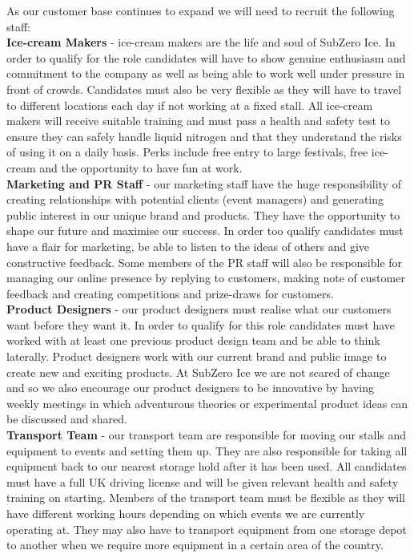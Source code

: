 \documentclass{article}
\begin{document}
  As our customer base continues to expand we will need to recruit the following staff: \\

  {\bf Ice-cream Makers} - ice-cream makers are the life and soul of SubZero Ice. In order to qualify for the role candidates will have to show genuine enthusiasm and commitment to the company as well as being able to work well under pressure in front of crowds. Candidates must also be very flexible as they will have to travel to different locations each day if not working at a fixed stall. All ice-cream makers will receive suitable training and must pass a health and safety test to ensure they can safely handle liquid nitrogen and that they understand the risks of using it on a daily basis. Perks include free entry to large festivals, free ice-cream and the opportunity to have fun at work. \\

  {\bf Marketing and PR Staff} - our marketing staff have the huge responsibility of creating relationships with potential clients (event managers) and generating public interest in our unique brand and products. They have the opportunity to shape our future and maximise our success. In order too qualify candidates must have a flair for marketing, be able to listen to the ideas of others and give constructive feedback. Some members of the PR staff will also be responsible for managing our online presence by replying to customers, making note of customer feedback and creating competitions and prize-draws for customers. \\

  {\bf Product Designers} - our product designers must realise what our customers want before they want it. In order to qualify for this role candidates must have worked with at least one previous product design team and be able to think laterally. Product designers work with our current brand and public image to create new and exciting products. At SubZero Ice we are not scared of change and so we also encourage our product designers to be innovative by having weekly meetings in which adventurous theories or experimental product ideas can be discussed and shared. \\

  {\bf Transport Team} - our transport team are responsible for moving our stalls and equipment to events and setting them up. They are also responsible for taking all equipment back to our nearest storage hold after it has been used. All candidates must have a full UK driving license and will be given relevant health and safety training on starting. Members of the transport team must be flexible as they will have different working hours depending on which events we are currently operating at. They may also have to transport equipment from one storage depot to another when we require more equipment in a certain area of the country. \\
\end{document}
